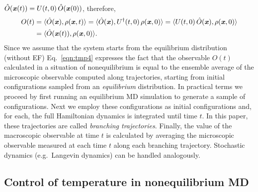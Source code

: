 \documentclass[a4paper,preprint,unsortedaddress,onecolumn]{revtex4-1}
\newcommand{\vect}[1]{\textbf{\textit{#1}}}
\begin{document}
$\hat O(\vect x(t)) = U(t,0)\,\hat O(\vect x(0))$, therefore,
\begin{align}\nonumber
  O(t) & = \langle \hat O(\vect x), \rho(\vect x, t)\rangle
  = \langle \hat O(\vect x), U^\dagger(t,0)\, \rho(\vect x, 0)\rangle
  = \langle U(t,0)\,\hat O(\vect x), \rho(\vect x, 0)\rangle\\\label{eqn:tmp4}
  &= \langle \hat O(\vect x(t)), \rho(\vect x, 0)\rangle.
\end{align}
Since we assume that the system starts from the equilibrium distribution (without EF)
 Eq.~\eqref{eqn:tmp4} expresses the fact that the 
observable $O(t)$ calculated in a situation of nonequilibrium is equal to the ensemble average of
the microscopic observable computed along trajectories, starting from
initial configurations sampled from an \emph{equilibrium}
distribution. In practical terms we proceed by first running an equilibrium MD simulation
to generate a sample of configurations. Next we employ these configurations as
initial configurations and, for each, the full Hamiltonian dynamics is integrated until
time $t$.
In this paper, these trajectories are called \emph{branching
  trajectories}.
Finally, the value of the macroscopic observable at time $t$ is
calculated by averaging the microscopic observable measured at each time $t$ along each branching trajectory.
Stochastic dynamics (e.g.~Langevin dynamics) can be handled analogously.




\subsection{Control of temperature in nonequilibrium MD}\label{sec:tmp2b}
\end{document}
